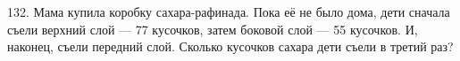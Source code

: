 132. Мама купила коробку сахара-рафинада. Пока её не было дома, дети сначала съели верхний слой --- 77 кусочков, затем боковой слой --- 55 кусочков. И, наконец, съели передний слой. Сколько кусочков сахара дети съели в третий раз?\\
